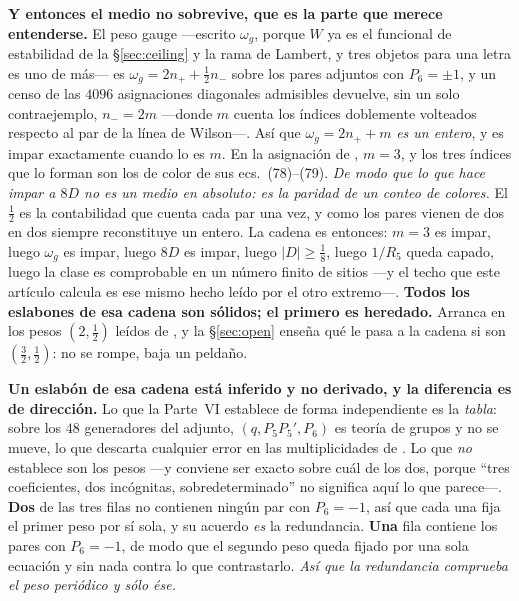 \documentclass[11pt,a4paper]{article}
\begin{document}
\noindent \textbf{Y entonces el medio no sobrevive, que es la parte que merece entenderse.} El peso
gauge ---escrito $\omega_g$, porque $W$ ya es el funcional de estabilidad de la
\S\ref{sec:ceiling} y la rama de Lambert, y tres objetos para una letra es uno de más--- es
$\omega_g=2n_++\tfrac12 n_-$ sobre los pares adjuntos con $P_6=\pm1$, y un censo de las $4096$
asignaciones diagonales admisibles devuelve, sin un solo contraejemplo, $n_-=2m$ ---donde $m$
cuenta los índices doblemente volteados respecto al par de la línea de Wilson---. Así que
$\omega_g=2n_++m$ \emph{es un entero}, y es impar exactamente cuando lo es $m$. En la asignación de
\cite{KM25}, $m=3$, y los tres índices que lo forman son los de color de sus ecs.~(78)--(79).
\emph{De modo que lo que hace impar a $8D$ no es un medio en absoluto: es la paridad de un conteo de
colores.} El $\tfrac12$ es la contabilidad que cuenta cada par una vez, y como los pares vienen de
dos en dos siempre reconstituye un entero. La cadena es entonces: $m=3$ es impar, luego $\omega_g$ es
impar, luego $8D$ es impar, luego $|D|\ge\tfrac18$, luego $1/R_5$ queda capado, luego la clase es
comprobable en un número finito de sitios ---y el techo que este artículo calcula es ese mismo
hecho leído por el otro extremo---.
\textbf{Todos los eslabones de esa cadena son sólidos; el primero es heredado.} Arranca en los
pesos $(2,\tfrac12)$ leídos de \cite{KM25}, y la \S\ref{sec:open} enseña qué le pasa a la cadena si
son $(\tfrac32,\tfrac12)$: no se rompe, baja un peldaño.

\noindent \textbf{Un eslabón de esa cadena está inferido y no derivado, y la diferencia es de
dirección.} Lo que la Parte~VI establece de forma independiente es la \emph{tabla}: sobre los $48$
generadores del adjunto, $(q,P_5P_5',P_6)$ es teoría de grupos y no se mueve, lo que descarta
cualquier error en las multiplicidades de \cite{KM25}. Lo que \emph{no} establece son los pesos
---y conviene ser exacto sobre cuál de los dos, porque ``tres coeficientes, dos incógnitas,
sobredeterminado'' no significa aquí lo que parece---. \textbf{Dos} de las tres filas no contienen
ningún par con $P_6=-1$, así que cada una fija el primer peso por sí sola, y su acuerdo \emph{es}
la redundancia. \textbf{Una} fila contiene los pares con $P_6=-1$, de modo que el segundo peso
queda fijado por una sola ecuación y sin nada contra lo que contrastarlo. \emph{Así que la
redundancia comprueba el peso periódico y sólo ése.}
\end{document}
